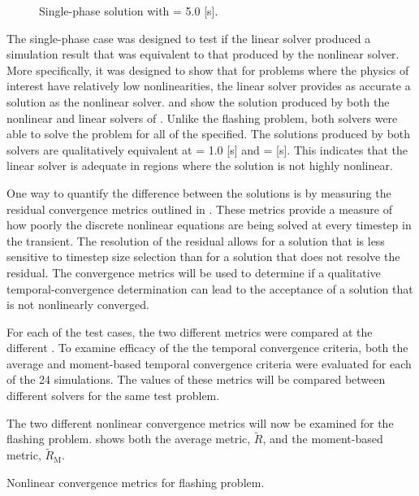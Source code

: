 \begin{figure}[h!tb]
\centering

\caption{Single-phase solution with \dtmax{} = 5.0 {[s]}.}
\label{fig:single1pt000em5}
\end{figure}

The single-phase case was designed to test if the linear solver produced a simulation result that was equivalent to that produced by the nonlinear solver.
More specifically, it was designed to show that for problems where the physics of interest have relatively low nonlinearities, the linear solver provides as accurate a solution as the nonlinear solver.
 and  show the solution produced by both the nonlinear and linear solvers of \cobra{}.
Unlike the flashing problem, both solvers were able to solve the problem for all of the \dtmax{} specified.
The solutions produced by both solvers are qualitatively equivalent at \dtmax{} = 1.0 [s] and \dtmax{} =  [s].
This indicates that the linear solver is adequate in regions where the solution is not highly nonlinear.

One way to quantify the difference between the solutions is by measuring the residual convergence metrics outlined in .
These metrics provide a measure of how poorly the discrete nonlinear equations are being solved at every timestep in the transient.
The resolution of the residual allows for a solution that is less sensitive to timestep size selection than for a solution that does not resolve the residual.
The convergence metrics will be used to determine if a qualitative temporal-convergence determination can lead to the acceptance of a solution that is not nonlinearly converged.

For each of the test cases, the two different metrics were compared at the different \dtmax{}.
To examine efficacy of the the temporal convergence criteria, both the average and moment-based temporal convergence criteria were evaluated for each of the 24 simulations.
The values of these metrics will be compared between different solvers for the same test problem. 

The two different nonlinear convergence metrics will now be examined for the flashing problem.
 shows both the average metric, $\tilde{R}$, and the moment-based metric, $\tilde{R}_{\text{M}}$.

\begin{table}[h!tb]
\centering
\singlespace

\caption{Nonlinear convergence metrics for flashing problem.}
\label{tab:flashingMetric}
\end{table}

